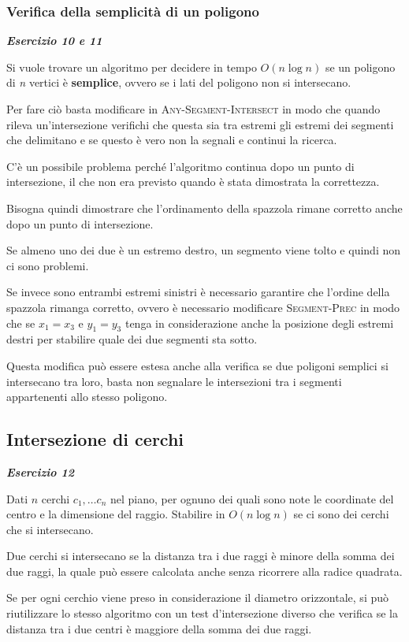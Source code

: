 \subsubsection{Verifica della semplicità di un poligono}

\textit{\textbf{Esercizio 10 e 11}}

Si vuole trovare un algoritmo per decidere in tempo $O(n \log n)$ se un poligono di \emph{n} vertici è \textbf{semplice}, ovvero se i lati del poligono non si intersecano.

Per fare ciò basta modificare in \textsc{Any-Segment-Intersect} in modo che quando rileva un'intersezione verifichi che questa sia tra estremi gli estremi dei segmenti che delimitano e se questo è vero non la segnali e continui la ricerca. 

C'è un possibile problema perché l'algoritmo continua dopo un punto di intersezione, il che non era previsto quando è stata dimostrata la correttezza.

Bisogna quindi dimostrare che l'ordinamento della spazzola rimane corretto anche dopo un punto di intersezione.

Se almeno uno dei due è un estremo destro, un segmento viene tolto e quindi non ci sono problemi. 

Se invece sono entrambi estremi sinistri è necessario garantire che l'ordine della spazzola rimanga corretto, ovvero è necessario modificare \textsc{Segment-Prec} in modo che se $x_1=x_3$ e $y_1=y_3$ tenga in considerazione anche la posizione degli estremi destri per stabilire quale dei due segmenti sta sotto.

Questa modifica può essere estesa anche alla verifica se due poligoni semplici si intersecano tra loro, basta non segnalare le intersezioni tra i segmenti appartenenti allo stesso poligono.

\subsection{Intersezione di cerchi}

\textbf{\textit{Esercizio 12}} 

Dati $n$ cerchi $c_1, \ldots c_n$ nel piano, per ognuno dei quali sono note le coordinate del centro e la dimensione del raggio.
Stabilire in $O(n \log n)$ se ci sono dei cerchi che si intersecano.

Due cerchi si intersecano se la distanza tra i due raggi è minore della somma dei due raggi, la quale può essere calcolata anche senza ricorrere alla radice quadrata.

Se per ogni cerchio viene preso in considerazione il diametro orizzontale, si può riutilizzare lo stesso algoritmo con un test d'intersezione diverso che verifica se la distanza tra i due centri è maggiore della somma dei due raggi.
